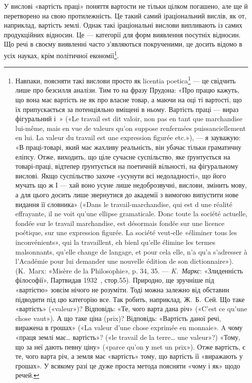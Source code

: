 У вислові «вартість праці» поняття вартости не тільки цілком
погашено, але ще й перетворено на свою протилежність. Це такий
самий іраціональний вислів, як от, наприклад, вартість землі.
Однак такі іраціональні вислови випливають із самих продукційних
відносин. Це — категорії для форм виявлення посутніх
відносин. Що речі в своєму виявленні часто з’являються
покрученими, це досить відомо в усіх науках, крім політичної
економії\footnote{
Навпаки, поясняти такі вислови просто як licentia poetica\footnote*{
— поетичні вільності. \emph{Ред.}
} — це свідчить лише про безсилля аналізи. Тим то на фразу Прудона: «Про
працю кажуть, що вона має вартість не як про власне товар, а маючи
на оці ті вартості, що їх припускається за потенціяльно вміщені в ньому.
Вартість праці — вираз фігуральний і~» («Le travail est dit valoir,
non pas en tant que marchandise lui-même, mais en vue de valeurs qu’on
suppose renfermées puissanciellement en lui. La valeur du travail est une
expression figurée etc.»), — я зауважую: «В праці-товарі, який має
жахливу реальність, він убачає тільки граматичну еліпсу. Отже,
виходить, що ціле сучасне суспільство, яке ґрунтується на товарі-праці,
відтепер ґрунтується на поетичній вільності, на фігуральному вислові.
Якщо суспільство захоче «усунути всі недоладності», що його мучать
що ж І — хай воно усуне лише недоброзвучні, вислови, змінить мову, а для
цього досить лише звернутися до академії з вимогою випустити нове
видання її словника» («Dans le travail-marchandise, qui est d une réalité
effrayante, il ne voit qu’une ellipse gramaticale. Donc toute la société actuelle,
fondée sur le travail marchandise, est désormais fondée sur une licence
poétique, sur une expression figurée. La société veut-elle «éliminer tous
les inconvénients», qui la travaillent, eh bienl qu’elle élimine les termes
malsonnants, qu’elle change de langage, et pour cela elle, n’a qu’a s’adresser
à l’Académie pour lui demander une nouvelle édition de son dictionnaire»).
(K.~Marx: «Misère de la Philosophie», p. 34, 35. — \emph{K.~Маркс}: «Злиденність
філософії», Партвидав 1932~, стор.55). Природно, ще зручніше під «вартістю»
зовсім нічого не розуміти. Тоді можна залежно від обставин підводити
під цю категорію все. Так робить, наприклад, Ж.~Б.~Сей. Що
таке «вартість» («valeur»)? Відповідь: «Те, чого варта дана річ» («C’est
ce qu’une chose vaut»). А що таке ціна (prix)? Відповідь: «Вартість даної
речі, виражена в грошах» («La valeur d’une chose exprimée en monnaie».
A чому «праця землі має\dots{} вартість»? («le travail de la terre\dots{} une
valeur»?) «Тому, що за неї дають певну ціну» («parce qu’on у met un
prix»). Отже вартість, є те, чого варта річ, а земля має «вартість» тому,
що вартість її «виражають у грошах». У всякому разі це дуже проста
метода поясняти «чому і як» щодо речей.
}.

